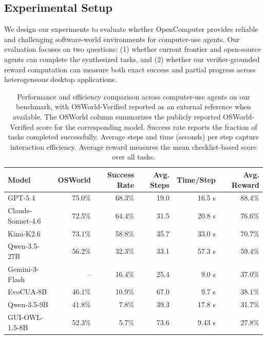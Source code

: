\documentclass{llmxive}
\providecommand{\arraystretch}{1.12}
\begin{document}
\subsection{Experimental Setup}
\label{sec:experimental-setup}
We design our experiments to evaluate whether OpenComputer provides reliable and challenging
software-world environments for computer-use agents. Our evaluation focuses on two questions:
(1) whether current frontier and open-source agents can complete the synthesized tasks, and
(2) whether our verifier-grounded reward computation can measure both exact success and
partial progress across heterogeneous desktop applications.
\begin{table}[t]
\centering
\small
\setlength{\tabcolsep}{5pt}
\renewcommand{\arraystretch}{1.12}
\vspace{-0.5em}
\begin{tabular}{l|r|rrrr}
\toprule
\textbf{Model} 
& \textbf{OSWorld} 
& \textbf{Success Rate} 
& \textbf{Avg. Steps} 
& \textbf{Time/Step} 
& \textbf{Avg. Reward} \\
\midrule
GPT-5.4           & 75.0\% & 68.3\% & 19.0 & 16.5 s  & 88.4\% \\
Claude-Sonnet-4.6 & 72.5\% & 64.4\% & 31.5 & 20.8 s  & 76.6\% \\
Kimi-K2.6         & 73.1\% & 58.8\% & 35.7 & 33.0 s  & 70.7\% \\
Qwen-3.5-27B      & 56.2\% & 32.3\% & 33.1 & 57.3 s  & 59.4\% \\
Gemini-3-Flash    & --     & 16.4\% & 25.4 & 9.0 s   & 37.0\% \\
EvoCUA-8B         & 46.1\% & 10.9\% & 67.0 & 9.7 s   & 38.1\% \\
Qwen-3.5-9B       & 41.8\% & 7.8\%  & 39.3 & 17.8 s  & 31.7\% \\
GUI-OWL-1.5-8B    & 52.3\% & 5.7\%  & 73.6 & 9.43 s  & 27.8\% \\
\bottomrule
\end{tabular}
\label{tab:model_results}
\caption{Performance and efficiency comparison across computer-use agents on our benchmark, with OSWorld-Verified reported as an external reference when available. The OSWorld column summarizes the publicly reported OSWorld-Verified score for the corresponding model. Success rate reports the fraction of tasks completed successfully. Average steps and time (seconds) per step capture interaction efficiency. Average reward measures the mean checklist-based score over all tasks.}
\end{table}
\end{document}
